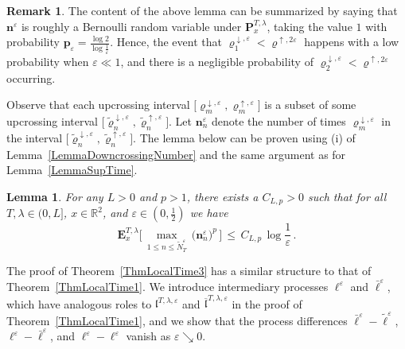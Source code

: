 \documentclass[10pt]{article}
\numberwithin{equation}{section}
\newtheorem{lemma}[theorem]{Lemma}
\theoremstyle{definition}
\newtheorem{remark}[theorem]{Remark}
\newcommand{\R}{{\mathbb R}}
\begin{document}
\begin{remark} The content of the above lemma can be summarized by saying that  $\mathbf{n}^{\varepsilon}$ is  roughly a Bernoulli random variable under $\mathbf{P}_{x}^{T,\lambda}$, taking the value $1$ with probability $\mathbf{p}_{\varepsilon}=\frac{ \log 2  }{\log  \frac{1}{\varepsilon}  } $.  Hence, the event that $\varrho_{1}^{\downarrow,\varepsilon}< \varrho^{\uparrow, 2\varepsilon}$ happens with a low probability when $\varepsilon\ll 1$, and there is a negligible probability of $\varrho_{2}^{\downarrow,\varepsilon}< \varrho^{\uparrow, 2\varepsilon}$ occurring.
\end{remark}

Observe that each upcrossing interval $\big[\varrho_{m}^{\downarrow,\varepsilon},\varrho_{m}^{\uparrow,\varepsilon}\big]$ is a subset of some upcrossing interval $\big[\widetilde{\varrho}_{n}^{\downarrow,\varepsilon},\widetilde{\varrho}_{n}^{\uparrow,\varepsilon}\big]$.  Let $\mathbf{n}^{\varepsilon}_n$ denote the number of times $\varrho_{m}^{\downarrow,\varepsilon}$ in the interval $\big[\widetilde{\varrho}_{n}^{\downarrow,\varepsilon},\widetilde{\varrho}_{n}^{\uparrow,\varepsilon}\big]$.  The lemma below can be proven using (i) of Lemma~\ref{LemmaDowncrossingNumber} and the same  argument as for  Lemma~\ref{LemmaSupTime}.
\begin{lemma}\label{LemmaSupTime2}  For any $ L>0$ and $p>1$, there exists a $C_{L,p}>0$ such that for all $T,\lambda \in (0, L]$, $x\in \R^2$, and $\varepsilon \in (0,\frac{1}{2})$ we have 
 $$\mathbf{E}^{T,\lambda}_{x}\bigg[\,\max_{1\leq n \leq \widetilde{N}_T^{\varepsilon} }\,\big(\mathbf{n}^{\varepsilon}_n \big)^p\, \bigg] \,\leq\, C_{L,p}\,\log\frac{1}{\varepsilon} \,. $$
\end{lemma}



The proof of Theorem~\ref{ThmLocalTime3} has a similar structure to that of Theorem~\ref{ThmLocalTime1}.  We introduce intermediary processes $\boldsymbol{\ell}^{\varepsilon}$ and $\boldsymbol{\bar{\ell}}^{\varepsilon}$, which have analogous roles to $\mathfrak{l}^{T,\lambda,\varepsilon}$ and $\overline{\mathfrak{l}}^{T,\lambda,\varepsilon}$ in the proof of Theorem~\ref{ThmLocalTime1}, and we show that the process differences $\boldsymbol{\bar{\ell}}^{\varepsilon}-\widetilde{\ell}^{\varepsilon}$, $\boldsymbol{\ell}^{\varepsilon}-\boldsymbol{\bar{\ell}}^{\varepsilon}$, and $\ell^{\varepsilon}-\boldsymbol{\ell}^{\varepsilon}$  vanish as $\varepsilon\searrow 0$.
\end{document}
